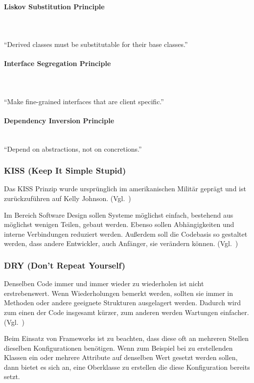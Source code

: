 \paragraph{Liskov Substitution Principle}
\\
\\
\enquote{Derived classes must be substitutable for their base classes.}\cite{solid}

\paragraph{Interface Segregation Principle}
\\
\\
\enquote{Make fine-grained interfaces that are client specific.}\cite{solid}

\paragraph{Dependency Inversion Principle}
\\
\enquote{Depend on abstractions, not on concretions.}\cite{solid}

\subsubsection{KISS (Keep It Simple Stupid)}
Das KISS Prinzip wurde ursprünglich im amerikanischen Militär geprägt und ist zurückzuführen auf Kelly Johnson.
(Vgl.~\cite{kelly-johnson-memoir})

Im Bereich Software Design sollen Systeme möglichst einfach, bestehend aus möglichst wenigen Teilen, gebaut werden.
Ebenso sollen Abhängigkeiten und interne Verbindungen reduziert werden.
Außerdem soll die Codebasis so gestaltet werden, dass andere Entwickler, auch Anfänger, sie verändern können.
(Vgl.~\cite{kiss-principle-explained})

\subsubsection{DRY (Don’t Repeat Yourself)}
Denselben Code immer und immer wieder zu wiederholen ist nicht erstrebenswert.
Wenn Wiederholungen bemerkt werden, sollten sie immer in Methoden oder andere geeignete Strukturen ausgelagert werden.
Dadurch wird zum einen der Code insgesamt kürzer, zum anderen werden Wartungen einfacher.
(Vgl.~\cite{the-pragmatic-programmer})

Beim Einsatz von Frameworks ist zu beachten, dass diese oft an mehreren Stellen dieselben Konfigurationen benötigen.
Wenn zum Beispiel bei zu erstellenden Klassen ein oder mehrere Attribute auf denselben Wert gesetzt werden sollen, dann bietet es sich an, eine Oberklasse zu erstellen die diese Konfiguration bereits setzt.


